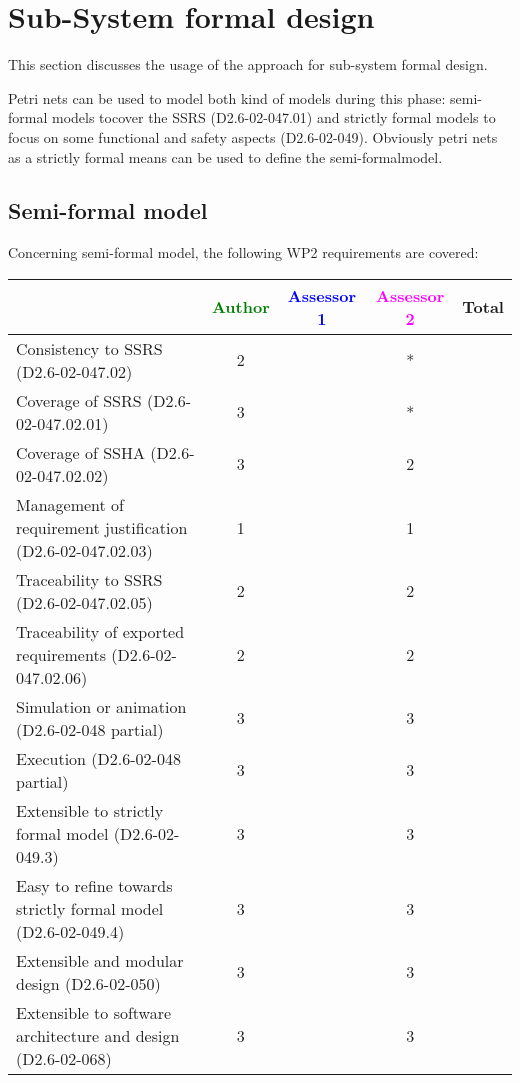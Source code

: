\section{Sub-System formal design}
This section discusses the usage of the approach for sub-system formal design.

Petri nets can be used to model both kind of models during this phase: semi-formal models tocover the SSRS (D2.6-02-047.01) and strictly formal  models to  focus on some functional and safety aspects (D2.6-02-049).  Obviously petri nets as a strictly  formal means can be used to define the semi-formalmodel.

\subsection{Semi-formal model}

Concerning semi-formal model, the following WP2 requirements are covered:

\begin{tabular}{|l | c | c | c | c|}
\hline
& \textcolor{green}{Author} & \textcolor{blue}{Assessor 1} & \textcolor{magenta}{Assessor 2} & Total \\
\hline 
Consistency to SSRS (D2.6-02-047.02) & 2    & & * &  \\
\hline
Coverage of SSRS (D2.6-02-047.02.01)  & 3    & & * &  \\
\hline
Coverage of SSHA (D2.6-02-047.02.02)  & 3    & & 2    &  \\
\hline
Management of requirement justification (D2.6-02-047.02.03)  & 1    & & 1    &  \\
\hline
Traceability to  SSRS (D2.6-02-047.02.05)  & 2    & & 2    &  \\
\hline
Traceability of exported requirements (D2.6-02-047.02.06)  & 2    & & 2    &  \\
\hline
Simulation or animation (D2.6-02-048 partial)  & 3    & & 3    &  \\
\hline
Execution (D2.6-02-048 partial)  & 3    & & 3    &  \\
\hline
Extensible to strictly formal model (D2.6-02-049.3) & 3    & & 3    &  \\
\hline
Easy to  refine towards strictly formal model (D2.6-02-049.4) & 3    & & 3    &  \\
\hline
Extensible and modular design (D2.6-02-050)  & 3    & & 3    &  \\
\hline
Extensible to software architecture and design (D2.6-02-068)   & 3    & & 3    &  \\
\hline
\end{tabular}

